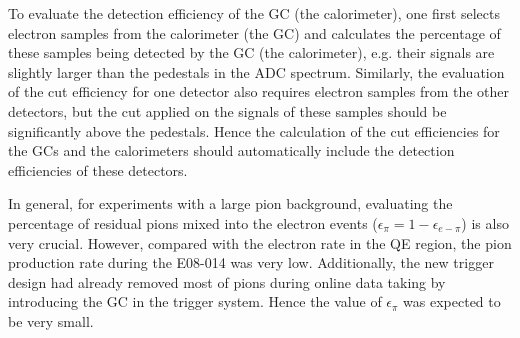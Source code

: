  To evaluate the detection efficiency of the GC (the calorimeter), one first selects electron samples from the calorimeter (the GC) and calculates the percentage of these samples being detected by the GC (the calorimeter), e.g. their signals are slightly larger than the pedestals in the ADC spectrum. Similarly, the evaluation of the cut efficiency for one detector also requires electron samples from the other detectors, but the cut applied on the signals of these samples should be significantly above the pedestals. Hence the calculation of the cut efficiencies for the GCs and the calorimeters should automatically include the detection efficiencies of these detectors.

 In general, for experiments with a large pion background, evaluating the percentage of residual pions mixed into the electron events ($\epsilon_{\pi}=1-\epsilon_{e-\pi}$) is also very crucial. However, compared with the electron rate in the QE region, the pion production rate during the E08-014 was very low. Additionally, the new trigger design had already removed most of pions during online data taking by introducing the GC in the trigger system. Hence the value of $\epsilon_{\pi}$ was expected to be very small. 
